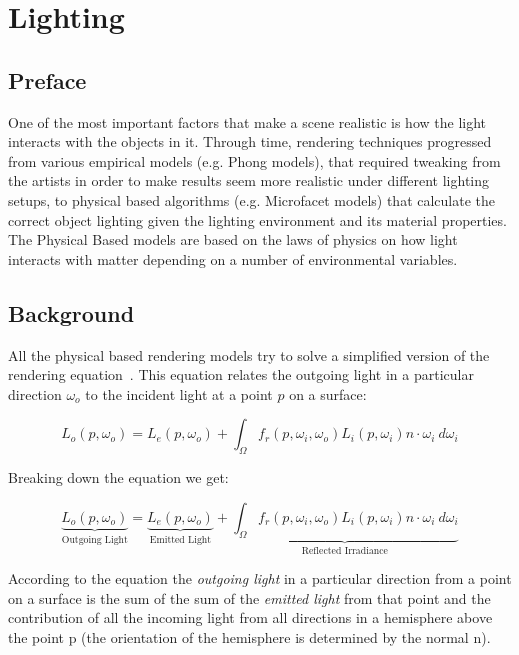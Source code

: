 \section{Lighting}
\subsection{Preface}
One of the most important factors that make a scene realistic is how the light interacts with the objects in it.
Through time, rendering techniques progressed from various empirical models (e.g. Phong models), that required
tweaking from the artists in order to make results seem more realistic under different lighting setups, to physical based
algorithms (e.g. Microfacet models) that calculate the correct object lighting given the lighting environment and
its material properties. The Physical Based models are based on the laws of physics on how light interacts with
matter depending on a number of environmental variables.

\subsection{Background}
All the physical based rendering models try to solve a simplified version of the rendering equation~\cite{lighting:ref32}.
This equation relates the outgoing light in a particular direction $\omega_o$ to the incident light at a point $p$ on a surface:

\begin{equation}
\label{eq:rendeq}
L_o(p,\omega_o) = L_e(p, \omega_o) + \int_\Omega f_r(p,\omega_i,\omega_o)L_i(p,\omega_i)n\cdot\omega_i \ d\omega_i
\end{equation}

\noindent Breaking down the equation we get:

\begin{equation}
\underbrace{L_o(p,\omega_o)}_\text{Outgoing Light} = \underbrace{L_e(p, \omega_o)}_\text{Emitted Light} + \underbrace{\int_\Omega f_r(p,\omega_i,\omega_o)L_i(p,\omega_i)n\cdot\omega_i \ d\omega_i}_\text{Reflected Irradiance}
\end{equation}

According to the equation the \textit{outgoing light} in a particular direction from a point on a surface is the sum of the
sum of the \textit{emitted light} from that point and the contribution of all the incoming light from all directions in a
hemisphere above the point p (the orientation of the hemisphere is determined by the normal n).

